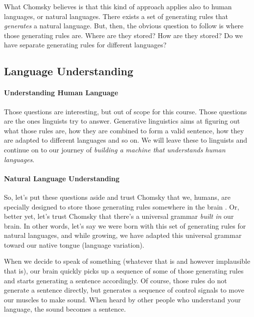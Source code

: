 \documentclass{report}
\begin{document}
What Chomsky believes is that this kind of approach applies also to human
languages, or natural languages. There exists a set of generating rules that
{\it generates} a natural language. But, then, the obvious question to follow is
where those generating rules are. Where are they stored? How are they stored? Do
we have separate generating rules for different languages? 

\subsection{Language Understanding}
\label{sec:language_understanding_wrong}

\paragraph{Understanding Human Language}

Those questions are interesting, but out of scope for this course. Those
questions are the ones linguists try to answer. Generative linguistics aims at
figuring out what those rules are, how they are combined to form a valid
sentence, how they are adapted to different languages and so on. We will leave
these to linguists and continue on to our journey of {\it building a machine
that understands human languages}. 

\paragraph{Natural Language Understanding}

So, let's put these questions aside and trust Chomsky that we, humans, are
specially designed to store those generating rules somewhere in the brain
\cite{chomsky1959review,carnie2013syntax}. Or, better yet, let's trust Chomsky
that there's a universal grammar {\it built in} our brain. In other words, let's
say we were born with this set of generating rules for natural languages, and
while growing, we have adapted this universal grammar toward our native tongue
(language variation).

When we decide to speak of something (whatever that is and however implausible
that is), our brain quickly picks up a sequence of some of those generating
rules and starts generating a sentence accordingly. Of course, those rules do
not generate a sentence directly, but generates a sequence of control signals to
move our muscles to make sound. When heard by other people who understand your
language, the sound becomes a sentence.
\end{document}
